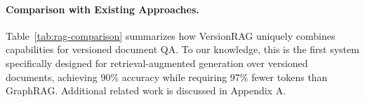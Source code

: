\paragraph{Comparison with Existing Approaches.}
Table~\ref{tab:rag-comparison} summarizes how VersionRAG uniquely combines capabilities for versioned document QA. To our knowledge, this is the first system specifically designed for retrieval-augmented generation over versioned documents, achieving 90\% accuracy while requiring 97\% fewer tokens than GraphRAG. Additional related work is discussed in Appendix A.

\begin{table}[hb]
\centering
\small
\caption{Comparison of RAG approaches for version-specific retrieval requirements. VersionRAG is the only method that directly addresses versioned documents, distinct from more generic temporal retrieval methods.}
\label{tab:rag-comparison}
\end{table}
